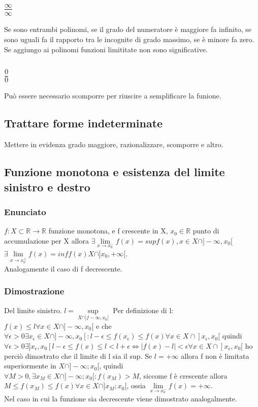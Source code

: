 \subsection{$\frac{\infty}{\infty}$}
Se sono entrambi polinomi, se il grado del numeratore \`e maggiore fa infinito, se sono uguali fa il rapporto tra le incognite di grado massimo, se \`e minore fa zero.
Se aggiungo ai polinomi funzioni limititate non sono significative.
\subsection{$\frac{0}{0}$}
Pu\`o essere necessario scomporre per riuscire a semplificare la funione.
\subsection{Trattare forme indeterminate}
Mettere in evidenza grado maggiore, razionalizzare, scomporre e altro.
\subsection{Funzione monotona e esistenza del limite sinistro e destro}
\subsubsection{Enunciato}
$f:X\subset\mathbb{R}\rightarrow\mathbb{R}$ funzione monotona, e f crescente in X, $x_0\in\mathbb{R}$ punto di accumulazione per X allora $\exists\lim\limits_{x\rightarrow x^-_0}
f(x)=sup f(x), x\in X\cap]-\infty, x_0[$\\
$\exists\lim\limits_{x\rightarrow x^+_0}f(x)=inf f(x) X\cap]x_0,+\infty[$.\\
Analogamente il caso di f decrescente.\\
\subsubsection{Dimostrazione}
Del limite sinistro. $l=\sup\limits_{X\cap]f-\infty, x_0[}$ Per definizione di l: $f(x)\le l \forall x\in X\cap]-\infty, x_0[$ e che $\forall \epsilon>0\exists x_\epsilon\in X
\cap]-\infty, x_0[: l-\epsilon\le f(x_\epsilon)\le f(x) \forall x\in X\cap]x_\epsilon, x_0[$ quindi $\forall\epsilon>0 \exists ]x_\epsilon, x_0[ l-\epsilon \le f(x)\le l<l+\epsilon\Leftrightarrow|f(x)-l|<\epsilon \forall x\in X\cap ]x_\epsilon, x_0[$ ho perci\`o dimostrato che il limite di l sia il sup. Se $l=+\infty$ allora f non \`e limitata
superiormente in $X\cap]-\infty;x_0[$, quindi $\forall M>0,\exists x_M\in X\cap]-\infty;x_0[:f(x_M)>M$, siccome f \`e crescente allora $M\le f(x_M)\le f(x)\forall x\in 
X\cap]x_M;x_0[$, ossia $\lim\limits_{x\rightarrow x_0^-}f(x)=+\infty$.\\
Nel caso in cui la funzione sia decrescente viene dimostrato analogalmente.
